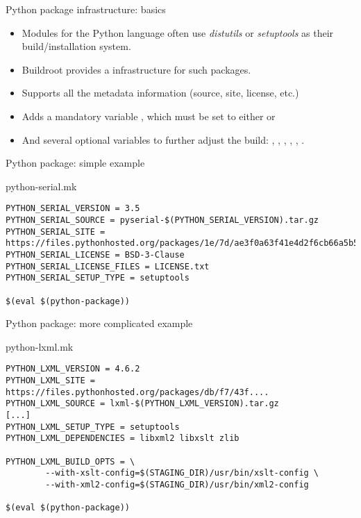 \begin{frame}{Python package infrastructure: basics}
  \begin{itemize}
  \item Modules for the Python language often use {\em distutils} or
    {\em setuptools} as their build/installation system.
  \item Buildroot provides a  infrastructure for
    such packages.
  \item Supports all the  metadata information
    (source, site, license, etc.)
  \item Adds a mandatory variable , which must
    be set to either  or 
  \item And several optional variables to further adjust the build:
    , ,
    ,
    , ,
    .
  \end{itemize}
\end{frame}

\begin{frame}[fragile]{Python package: simple example}

  \begin{block}{python-serial.mk}
    \begin{verbatim}
PYTHON_SERIAL_VERSION = 3.5
PYTHON_SERIAL_SOURCE = pyserial-$(PYTHON_SERIAL_VERSION).tar.gz
PYTHON_SERIAL_SITE = https://files.pythonhosted.org/packages/1e/7d/ae3f0a63f41e4d2f6cb66a5b57197850f919f59e558159a4dd3a818f5082
PYTHON_SERIAL_LICENSE = BSD-3-Clause
PYTHON_SERIAL_LICENSE_FILES = LICENSE.txt
PYTHON_SERIAL_SETUP_TYPE = setuptools

$(eval $(python-package))
    \end{verbatim}
  \end{block}

\end{frame}

\begin{frame}[fragile]{Python package: more complicated example}
  \begin{block}{python-lxml.mk}
    \begin{verbatim}
PYTHON_LXML_VERSION = 4.6.2
PYTHON_LXML_SITE = https://files.pythonhosted.org/packages/db/f7/43f....
PYTHON_LXML_SOURCE = lxml-$(PYTHON_LXML_VERSION).tar.gz
[...]
PYTHON_LXML_SETUP_TYPE = setuptools
PYTHON_LXML_DEPENDENCIES = libxml2 libxslt zlib

PYTHON_LXML_BUILD_OPTS = \
        --with-xslt-config=$(STAGING_DIR)/usr/bin/xslt-config \
        --with-xml2-config=$(STAGING_DIR)/usr/bin/xml2-config

$(eval $(python-package))
    \end{verbatim}
  \end{block}
\end{frame}

